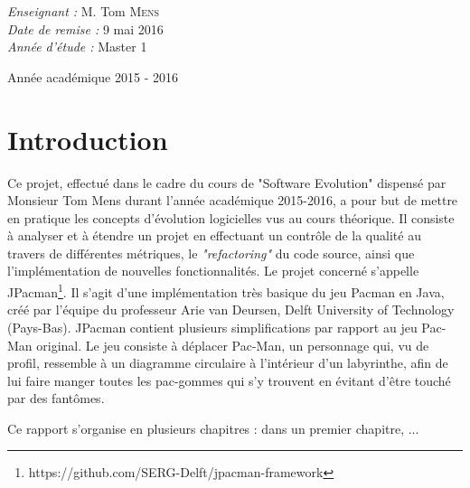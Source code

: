 \documentclass[12pt, openany]{report}
\begin{document}
\begin{titlepage}
\begin{sffamily}
\begin{center}
\begin{minipage}{0.4\textwidth}
\begin{flushleft}
      \end{flushleft}
    \end{minipage}
    \begin{minipage}{0.4\textwidth}
      \begin{flushright} \large
        \emph{Enseignant :} M. Tom  \textsc{Mens}\\
        \emph{Date de remise : } 9 mai 2016\\
        \emph{Année d'étude : } Master 1
      \end{flushright}
    \end{minipage}

    \vfill

    {\large Année académique 2015 - 2016}
	
  \end{center}
  \end{sffamily}
\end{titlepage}




\newpage

	\renewcommand{\thesection}{\arabic{section}}
	\tableofcontents
	\newpage
	\setcounter{secnumdepth}{3}
	\setcounter{tocdepth}{4}
	

\section{Introduction}

Ce projet, effectué dans le cadre du cours de "Software Evolution" dispensé par Monsieur Tom Mens durant l'année académique 2015-2016, a pour but de mettre en pratique les concepts d'évolution logicielles vus au cours théorique. Il consiste à analyser et à étendre un projet en effectuant un contrôle de la qualité au travers de différentes métriques, le \textit{"refactoring"} du code source, ainsi que l'implémentation de nouvelles fonctionnalités. Le projet concerné s'appelle JPacman\footnote{https://github.com/SERG-Delft/jpacman-framework}. Il s'agit d'une implémentation très basique du jeu Pacman en Java, créé par l'équipe  du professeur Arie van Deursen, Delft University of Technology (Pays-Bas).
 JPacman contient plusieurs simplifications par rapport au jeu Pac-Man original. Le jeu consiste à déplacer Pac-Man, un personnage qui, vu de profil, ressemble à un diagramme circulaire à l’intérieur d’un labyrinthe, afin de lui faire manger toutes les pac-gommes qui s’y trouvent en évitant d’être touché par des fantômes.
 
 Ce rapport s'organise en plusieurs chapitres : dans un premier chapitre, ...
 
\end{document}
